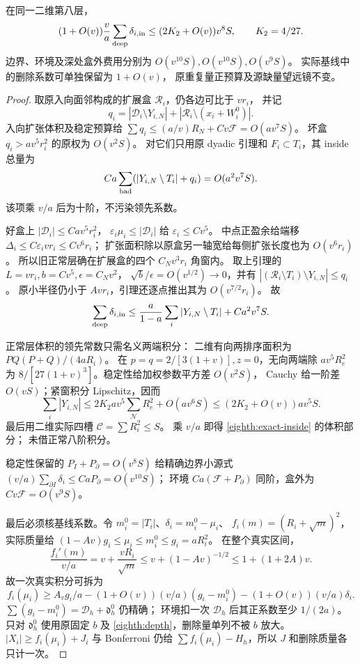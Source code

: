 \begin{lemma}[实际删除量及基线导数]\label{eighth:exact-small-source}
在同一二维第八层，
\begin{equation}\label{eighth:exact-inside}
 (1+O(v))\frac va\sum_{\rm deep}\delta_{i,\rm in}
 \le(2K_2+O(v))v^8S,\qquad K_2=4/27.
\end{equation}
边界、环境及深处盒外费用分别为 \(O(v^{10}S),O(v^{10}S),O(v^9S)\)。
实际基线中的删除系数可单独保留为 \(1+O(v)\)，
原重复量正预算及源缺量望远镜不变。
\end{lemma}
\begin{proof}
取原入向面邻构成的扩展盒 \(\mathcal R_i\)，仍各边可比于 \(vr_i\)，
并记
\[
 q_i=|\mathscr D_i\setminus Y_{i,N}|+|\mathcal R_i\setminus(x_i+W_i^0)|.
\]
入向扩张体积及稳定预算给
\(\sum q_i\le(a/v)R_N+Cv\mathcal F=O(av^7S)\)。
坏盒 \(q_i>av^5r_i^2\) 的原权为 \(O(v^2S)\)。
对它们只用原 dyadic 引理和 \(F_i\subset T_i\)，其 inside 总量为
\[
 Ca\sum_{\rm bad}(|Y_{i,N}\setminus T_i|+q_i)=O(a^2v^7S).
\]
该项乘 \(v/a\) 后为十阶，不污染领先系数。

好盒上 \(|\mathscr D_i|\le Cav^5r_i^2\)，
\(\varepsilon_i\mu_i\le|\mathscr D_i|\) 给 \(\varepsilon_i\le Cv^5\)。
中点正盈余给端移 \(\Delta_i\le C\varepsilon_i vr_i\le Cv^6r_i\)；
扩张面积除以原盒另一轴宽给每侧扩张长度也为 \(O(v^6r_i)\)。
所以旧正常层确在扩展盒的四个 \(C_Nv^3r_i\) 角窗内。
取上引理的 \(L=vr_i,b=Cv^5,\epsilon=C_Nv^2\)，
\(\sqrt b/\epsilon=O(v^{1/2})\to0\)，并有
\(|(\mathcal R_i\setminus T_i)\setminus Y_{i,N}|\le q_i\)。
原小半径仍小于 \(Avr_i\)，引理还逐点推出其为 \(O(v^{7/2}r_i)\)。
故
\[
 \sum_{\rm deep}\delta_{i,\rm in}
 \le\frac a{1-a}\sum_i|Y_{i,N}\setminus T_i|+Ca^2v^7S.
\]

正常层体积的领先常数只需名义两端积分：
二维有向两排序面积为 \(PQ(P+Q)/(4aR_i)\)。
在 \(p=q=2/[3(1+v)],z=0\)，无向两端除 \(av^5R_e^2\)
为 \(8/[27(1+v)^3]\)。稳定性给加权参数平方差 \(O(v^2S)\)，
Cauchy 给一阶差 \(O(vS)\)；紧窗积分 Lipschitz，因而
\[
 \sum_i|Y_{i,N}|\le2K_2av^5\sum_{\mathcal N}R_e^2+O(av^6S)
 \le(2K_2+O(v))av^5S.
\]
最后用二维实际四槽 \(\mathcal C=\sum R_i^2\le S\)。
乘 \(v/a\) 即得 \eqref{eighth:exact-inside} 的体积部分；
未借正常八阶积分。

稳定性保留的 \(P_I+P_\partial=O(v^8S)\) 给精确边界小源式
\((v/a)\sum_{\partial I}\delta_i\le CaP_\partial=O(v^{10}S)\)；
环境 \(Ca(\mathcal F+P_\partial)\) 同阶，盒外为 \(Cv\mathcal F=O(v^9S)\)。

最后必须核基线系数。令 \(m_i^0=|T_i|\)、\(\delta_i=m_i^0-\mu_i\)、
\(f_i(m)=(R_i+\sqrt m)^2\)，实际质量给
\((1-Av)g_i\le\mu_i\le m_i^0\le g_i=aR_i^2\)。
在整个真实区间，
\[
 \frac{f_i'(m)}{v/a}=v+\frac{vR_i}{\sqrt m}
 \le v+(1-Av)^{-1/2}\le1+(1+2A)v.
\]
故一次真实积分可拆为
\[
 f_i(\mu_i)\ge A_vg_i/a
 -(1+O(v))(v/a)(g_i-m_i^0)
 -(1+O(v))(v/a)\delta_i.
\]
\(\sum(g_i-m_i^0)=\mathcal D_h+\mathfrak d_h^0\) 仍精确；
环境扣一次 \(\mathcal D_h\) 后其正系数至少 \(1/(2a)\)。
只对 \(\mathfrak d_h^0\) 使用原固定 \(b\) 及
\eqref{eighth:depth}，删除量单列不被 \(b\) 放大。
\(|X_i|\ge f_i(\mu_i)+J_i\) 与 Bonferroni 仍给
\(\sum f_i(\mu_i)-H_h\)，所以 \(J\) 和删除质量各只计一次。
\end{proof}

